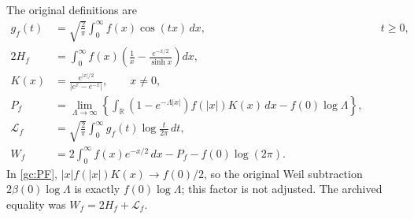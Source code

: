 \documentclass[11pt]{article}
\newcommand{\R}{\mathbb R}
\begin{document}
The original definitions are
\begin{align}
 g_f(t)&=\sqrt{\frac2\pi}\int_0^\infty f(x)\cos(tx)\,dx,
 &&t\ge0,\label{gc:cosine}\\
 2H_f&=\int_0^\infty f(x)
       \left(\frac1x-\frac{e^{-x/2}}{\sinh x}\right)dx,
 \label{gc:H}\\
 K(x)&=\frac{e^{|x|/2}}{|e^x-e^{-x}|},\qquad x\ne0,
 \label{gc:K}\\
 P_f&=\lim_{\Lambda\to\infty}
 \left\{\int_\R(1-e^{-\Lambda|x|})f(|x|)K(x)\,dx
              -f(0)\log\Lambda\right\},
 \label{gc:PF}\\
 \mathscr L_f&=\sqrt{\frac2\pi}\int_0^\infty
             g_f(t)\log\frac{t}{2\pi}\,dt,
 \label{gc:L}\\
 W_f&=2\int_0^\infty f(x)e^{-x/2}\,dx-P_f-f(0)\log(2\pi).
 \label{gc:W}
\end{align}
In \eqref{gc:PF}, $|x|f(|x|)K(x)\to f(0)/2$, so the original
Weil subtraction $2\beta(0)\log\Lambda$ is exactly
$f(0)\log\Lambda$; this factor is not adjusted.
The archived equality was $W_f=2H_f+\mathscr L_f$.
\end{document}
